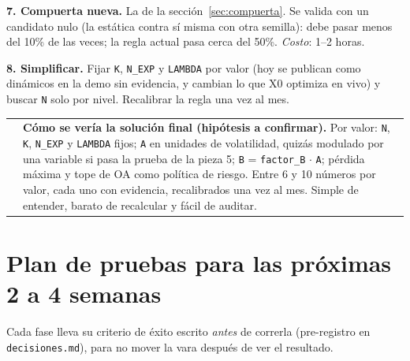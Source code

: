 \documentclass[11pt,a4paper]{article}
\makeatletter
\newcommand{\code}[1]{\texttt{\small #1}}
\newenvironment{caja}[1]{%
  \par\medskip\noindent
  \begin{tabular}{@{}p{0.4em}@{\hspace{8pt}}p{\dimexpr\linewidth-2em\relax}@{}}
  \textcolor{#1}{\rule{3pt}{1.1em}} &
}{\end{tabular}\par\medskip}
\newenvironment{clave}{\begin{caja}{cmorado}}{\end{caja}}
\makeatother
\begin{document}
\textbf{7. Compuerta nueva.} La de la sección~\ref{sec:compuerta}. Se valida con un candidato nulo (la
estática contra sí misma con otra semilla): debe pasar menos del 10\% de las veces; la regla actual pasa
cerca del 50\%. \emph{Costo}: 1--2 horas.

\textbf{8. Simplificar.} Fijar \code{K}, \code{N\_EXP} y \code{LAMBDA} por valor (hoy se publican como
dinámicos en la demo sin evidencia, y cambian lo que X0 optimiza en vivo) y buscar \code{N} solo por
nivel. Recalibrar la regla una vez al mes.

\begin{clave}
\textbf{Cómo se vería la solución final (hipótesis a confirmar).} Por valor: \code{N}, \code{K},
\code{N\_EXP} y \code{LAMBDA} fijos; \code{A} en unidades de volatilidad, quizás modulado por una variable
si pasa la prueba de la pieza 5; \code{B} = \code{factor\_B} $\cdot$ \code{A}; pérdida máxima y tope de OA
como política de riesgo. Entre 6 y 10 números por valor, cada uno con evidencia, recalibrados una vez al
mes. Simple de entender, barato de recalcular y fácil de auditar.
\end{clave}

\section{Plan de pruebas para las próximas 2 a 4 semanas}
\label{sec:plan}

Cada fase lleva su criterio de éxito escrito \emph{antes} de correrla (pre-registro en
\code{decisiones.md}), para no mover la vara después de ver el resultado.
\end{document}

